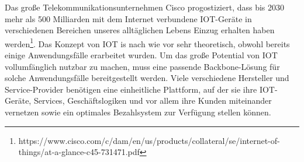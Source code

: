 \documentclass[
    ngerman,american
    ]{scrartcl}
\newcommand{\lang}{de}
\begin{document}
\begin{description}[style=unboxed]
            \item [\questionTwo{\lang}]
		Das große Telekommunikationsunternehmen Cisco progostiziert, dass bis 2030 mehr als 500 Milliarden mit dem Internet verbundene IOT-Geräte in verschiedenen Bereichen unseres alltäglichen Lebens Einzug erhalten haben werden\footnote{https://www.cisco.com/c/dam/en/us/products/collateral/se/internet-of-things/at-a-glance-c45-731471.pdf}. Das Konzept von IOT is nach wie vor sehr theoretisch, obwohl bereits einige Anwendungsfälle erarbeitet wurden. Um das große Potential von IOT vollumfänglich nutzbar zu machen, muss eine passende Backbone-Lösung für solche Anwendungsfälle bereitgestellt werden. Viele verschiedene Hersteller und Service-Provider benötigen eine einheitliche Plattform, auf der sie ihre IOT-Geräte, Services, Geschäftslogiken und vor allem ihre Kunden miteinander vernetzen sowie ein optimales Bezahlsystem zur Verfügung stellen können.



\end{description}
\end{document}
